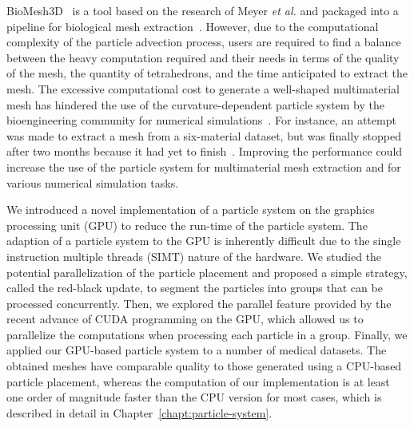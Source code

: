 BioMesh3D~\cite{SCI:BioMesh3D} is a tool based on the research of Meyer \textit{et al.} and packaged into a pipeline for biological mesh extraction~\cite{SCI:Cal2009a}. However, due to the computational complexity of the particle advection process, users are required to find a balance between the heavy computation required and their needs in terms of the quality of the mesh, the quantity of tetrahedrons, and the time anticipated to extract the mesh. The excessive computational cost to generate a well-shaped multimaterial mesh has hindered the use of the curvature-dependent particle system by the bioengineering community for numerical simulations~\cite{SCI:Swe2010a}. For instance, an attempt was made to extract a mesh from a six-material dataset, but was finally stopped after two months because it had yet to finish~\cite{Swe2012}. Improving the performance could increase the use of the particle system for multimaterial mesh extraction and for various numerical simulation tasks.

We introduced a novel implementation of a particle system on the graphics processing unit (GPU) to reduce the run-time of the particle system. The adaption of a particle system to the GPU is inherently difficult due to the  single instruction multiple threads (SIMT) nature of the hardware. We studied the potential parallelization of the particle placement and proposed a simple strategy, called the red-black update, to segment the particles into groups that can be processed concurrently. Then, we explored the parallel feature provided by the recent advance of CUDA programming on the GPU, which allowed us to parallelize the computations when processing each particle in a group. Finally, we applied our GPU-based particle system to a number of medical datasets. The obtained meshes have comparable quality to those generated using a CPU-based particle placement, whereas the computation of our implementation is at least one order of magnitude faster than the CPU version for most cases, which is described in detail in Chapter~\ref{chapt:particle-system}.

